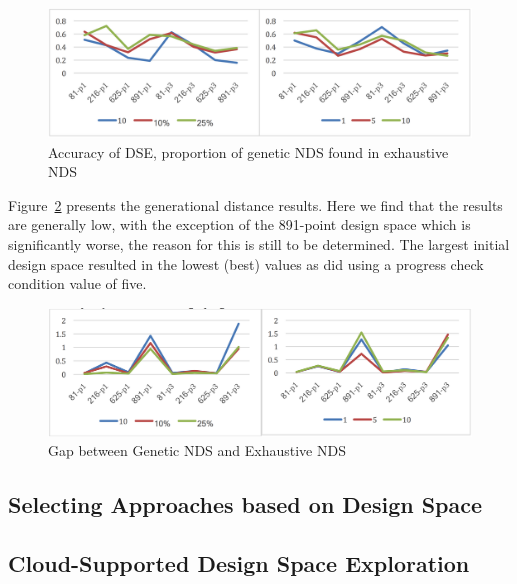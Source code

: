 \begin{figure}[p]
	\centering
	\includegraphics[width=1\textwidth]{figures/ga_accuracy}
	\caption{Accuracy of DSE, proportion of genetic NDS found in exhaustive NDS}
	\label{fig:acc_ga_ex}
\end{figure}
Figure~\ref{fig:gap_ga_ex} presents the generational distance results.  Here we find that the results are generally low, with the exception of the 891-point design space which is significantly worse, the reason for this is still to be determined.  The largest initial design space resulted in the lowest (best) values as did using a progress check condition value of five.


\begin{figure}[p]
	\centering
	\includegraphics[width=1\textwidth]{figures/ga_distance}
	\caption{Gap between Genetic NDS and Exhaustive NDS}
	\label{fig:gap_ga_ex}
\end{figure}

\subsection{Selecting Approaches based on Design Space}






\subsection{Cloud-Supported Design Space Exploration}




